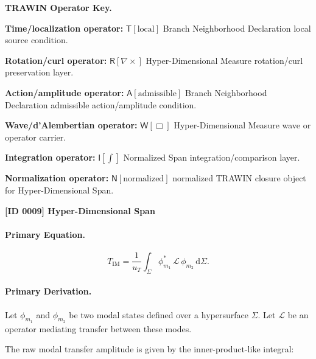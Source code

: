 \par\vspace{0.45\baselineskip}
\noindent\begin{minipage}[t]{\linewidth}
\begingroup
\small
\raggedright
\textbf{TRAWIN Operator Key.}\par
\noindent\textbf{Time/localization operator:} $\mathsf{T}\!\left[\mathrm{local}\right]$ Branch Neighborhood Declaration local source condition.\par
\noindent\textbf{Rotation/curl operator:} $\mathsf{R}\!\left[\nabla\times\right]$ Hyper-Dimensional Measure rotation/curl preservation layer.\par
\noindent\textbf{Action/amplitude operator:} $\mathsf{A}\!\left[\mathrm{admissible}\right]$ Branch Neighborhood Declaration admissible action/amplitude condition.\par
\noindent\textbf{Wave/d'Alembertian operator:} $\mathsf{W}\!\left[\Box\right]$ Hyper-Dimensional Measure wave or operator carrier.\par
\noindent\textbf{Integration operator:} $\mathsf{I}\!\left[\int\right]$ Normalized Span integration/comparison layer.\par
\noindent\textbf{Normalization operator:} $\mathsf{N}\!\left[\mathrm{normalized}\right]$ normalized TRAWIN closure object for Hyper-Dimensional Span.\par
\endgroup
\end{minipage}

\clearpage
\noindent\textbf{[ID 0009] Hyper-Dimensional Span}\par
\vspace{0.35em}
\paragraph{Primary Equation.}
\begin{equation}
T_{\mathrm{IM}}
=
\frac{1}{u_T}
\int_{\Sigma}
\phi_{m_1}^{*}
\,\mathcal{L}\,
\phi_{m_2}
\,\mathrm{d}\Sigma .
\end{equation}

\paragraph{Primary Derivation.}
Let $\phi_{m_1}$ and $\phi_{m_2}$ be two modal states defined over a hypersurface $\Sigma$.  
Let $\mathcal{L}$ be an operator mediating transfer between these modes.

The raw modal transfer amplitude is given by the inner-product-like integral:

